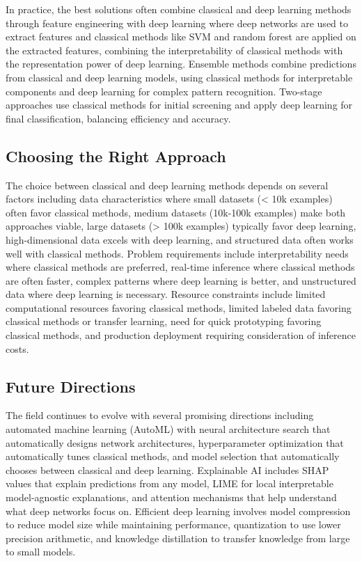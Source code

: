 In practice, the best solutions often combine classical and deep learning methods through feature engineering with deep learning where deep networks are used to extract features and classical methods like SVM and random forest are applied on the extracted features, combining the interpretability of classical methods with the representation power of deep learning. Ensemble methods combine predictions from classical and deep learning models, using classical methods for interpretable components and deep learning for complex pattern recognition. Two-stage approaches use classical methods for initial screening and apply deep learning for final classification, balancing efficiency and accuracy.

\subsection{Choosing the Right Approach}

The choice between classical and deep learning methods depends on several factors including data characteristics where small datasets (< 10k examples) often favor classical methods, medium datasets (10k-100k examples) make both approaches viable, large datasets (> 100k examples) typically favor deep learning, high-dimensional data excels with deep learning, and structured data often works well with classical methods. Problem requirements include interpretability needs where classical methods are preferred, real-time inference where classical methods are often faster, complex patterns where deep learning is better, and unstructured data where deep learning is necessary. Resource constraints include limited computational resources favoring classical methods, limited labeled data favoring classical methods or transfer learning, need for quick prototyping favoring classical methods, and production deployment requiring consideration of inference costs.

\subsection{Future Directions}

The field continues to evolve with several promising directions including automated machine learning (AutoML) with neural architecture search that automatically designs network architectures, hyperparameter optimization that automatically tunes classical methods, and model selection that automatically chooses between classical and deep learning. Explainable AI includes SHAP values that explain predictions from any model, LIME for local interpretable model-agnostic explanations, and attention mechanisms that help understand what deep networks focus on. Efficient deep learning involves model compression to reduce model size while maintaining performance, quantization to use lower precision arithmetic, and knowledge distillation to transfer knowledge from large to small models.

